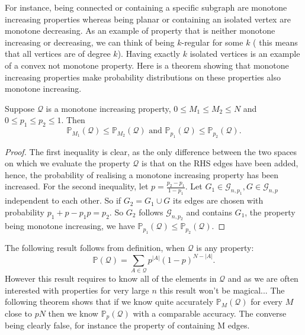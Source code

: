 For instance, being connected or containing a specific subgraph are monotone increasing properties whereas being planar or containing an isolated vertex are monotone decreasing. 
As an example of property that is neither monotone increasing or decreasing, we can think of being $k$-regular for some $k$ ( this means that all vertices are of degree $k$).
Having exactly $k$ isolated vertices is an example of a convex not monotone property.
\newline
Here is a theorem showing that monotone increasing properties make probability distributions on these properties also monotone increasing.
\begin{theorem}\label{th:QIncr}
	Suppose $\mathcal{Q}$ is a monotone increasing property, $0 \leq M_1 \leq M_2 \leq N$ and $0 \leq p_1 \leq p_2 \leq 1$.
	\newline
	Then
	\begin{equation}
		\mathbb{P}_{M_1}(\mathcal{Q}) \leq  \mathbb{P}_{M_2}(\mathcal{Q}) \text{  and  } \mathbb{P}_{p_1}(\mathcal{Q}) \leq \mathbb{P}_{p_2}(\mathcal{Q}).
	\end{equation}
\end{theorem}
\begin{proof}
	The first inequality is clear, as the only difference between the two spaces on which we evaluate the property $\mathcal{Q}$ is that on the RHS edges have been added, hence, the probability of realising a monotone increasing property has been increased.	
	\newline
	For the second inequality, let $p = \frac{p_2 - p_1}{1 - p_1}$. Let $G_1 \in \mathcal{G}_{n, p_1}, G \in \mathcal{G}_{n, p}$ independent to each other.
	\newline
	So if $G_2 = G_1 \cup G$ its edges are chosen with probability $p_1 + p - p_1 p = p_2$. 
	So $G_2$ follows $\mathcal{G}_{n,p_2}$ and contains $G_1$, the property being monotone increasing, we have $ \mathbb{P}_{p_1}(\mathcal{Q}) \leq \mathbb{P}_{p_2}(\mathcal{Q})$.
\end{proof}
The following result follows from definition, when $\mathcal{Q}$ is any property:
\begin{equation}\label{eq:QProp}
	\mathbb{P}(\mathcal{Q}) = \sum_{A \in \mathcal{Q}} p^{|A|}(1-p)^{N-|A|}.
\end{equation}
However this result requires to know all of the elements in $\mathcal{Q}$ and as we are often interested with properties for very large $n$ this result won't be magical... 
\newline
The following theorem shows that if we know quite accurately $\mathbb{P}_M(\mathcal{Q})$ for every $M$ close to $pN$ then we know $\mathbb{P}_p(\mathcal{Q})$ with a comparable accuracy. The converse being clearly false, for instance the property of containing M edges.

